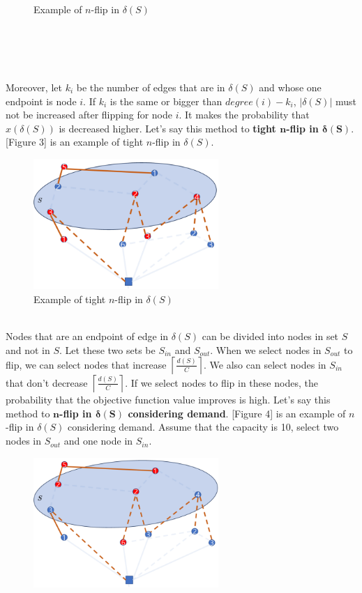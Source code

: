 \documentclass[11pt]{article}
\begin{document}
\begin{spacing}{1.5}
\begin{figure}[htb!]
    \caption{Example of $n$-flip in $\delta(S)$}
\end{figure}
\\ \\ \\ \\ \indent Moreover, let $k_i$ be the number of edges that are in $\delta(S)$ and whose one endpoint is node $i$. If $k_i$ is the same or bigger than $degree(i) - k_i$, $|\delta(S)|$ must not be increased after flipping for node $i$. It makes the probability that $x(\delta(S))$ is decreased higher. Let's say this method to \textbf{tight $\boldsymbol{n}$-flip in $\boldsymbol{\delta(S)}$}. [Figure 3] is an example of tight $n$-flip in $\delta(S)$. \\
\begin{figure}[htb!]
    \centerline{\includegraphics[width=7cm]{image3.png}}
    \caption{Example of tight $n$-flip in $\delta(S)$}
\end{figure}
\\ \indent Nodes that are an endpoint of edge in $\delta(S)$ can be divided into nodes in set $S$ and not in $S$. Let these two sets be $S_{in}$ and $S_{out}$. When we select nodes in $S_{out}$ to flip, we can select nodes that increase $\left\lceil\frac{d(S)}{C}\right\rceil$. We also can select nodes in $S_{in}$ that don't decrease $\left\lceil\frac{d(S)}{C}\right\rceil$. If we select nodes to flip in these nodes, the probability that the objective function value improves is high. Let's say this method to \textbf{$\boldsymbol{n}$-flip in $\boldsymbol{\delta(S)}$ considering demand}. [Figure 4] is an example of $n$-flip in $\delta(S)$ considering demand. Assume that the capacity is 10, select two nodes in $S_{out}$ and one node in $S_{in}$.\\
\begin{figure}[htb!]
    \centerline{\includegraphics[width=7cm]{image4.png}}

\end{figure}
\end{spacing}
\end{document}
